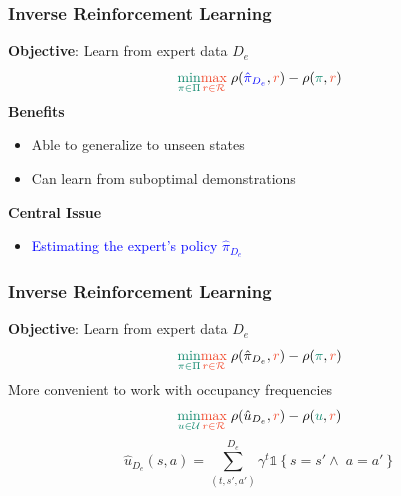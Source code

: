 \documentclass{beamer}
\begin{document}
\begin{frame}
	\frametitle{Inverse Reinforcement Learning}
	\textbf{Objective}: Learn from expert data $D_e$
	\[ 
		\textcolor{PineGreen}{\min_{\pi \in \Pi}} \textcolor{RedOrange}{\max_{r \in \mathcal{R}}} \; \rho(\textcolor{blue}{\hat{\pi}_{D_e}}, \textcolor{RedOrange}{r}) - \rho(\textcolor{PineGreen}{\pi}, \textcolor{RedOrange}{r})
	\]
	\vfill
	\textbf{Benefits}
	\begin{itemize}
		\item Able to generalize to unseen states
		\item Can learn from suboptimal demonstrations
	\end{itemize}
	\vfill
	\textbf{Central Issue}
	\begin{itemize}
		\item \textcolor{blue}{Estimating the expert's policy $\hat{\pi}_{D_e}$}
	\end{itemize}
\end{frame}

\begin{frame}
	\frametitle{Inverse Reinforcement Learning}
	\textbf{Objective}: Learn from expert data $D_e$
	\[ 
		\textcolor{PineGreen}{\min_{\pi \in \Pi}} \textcolor{RedOrange}{\max_{r \in \mathcal{R}}}\; \rho(\hat{\pi}_{D_e}, \textcolor{RedOrange}{r}) - \rho(\textcolor{PineGreen}{\pi}, \textcolor{RedOrange}{r})
	\]
	\vfill
	More convenient to work with occupancy frequencies
	\[
		\textcolor{PineGreen}{\min_{u \in \mathcal{U}}} \textcolor{RedOrange}{\max_{r \in \mathcal{R}}}\; \rho(\hat{u}_{D_e}, \textcolor{RedOrange}{r}) - \rho(\textcolor{PineGreen}{u}, \textcolor{RedOrange}{r})
	\]
	\vfill
	\[
		\hat{u}_{D_e}(s,a) = \sum_{(t, s',a')}^{D_e} \gamma^t \mathds{1} \left\{s=s' \wedge\; a=a'\right\}
	\]
\end{frame}
\end{document}
